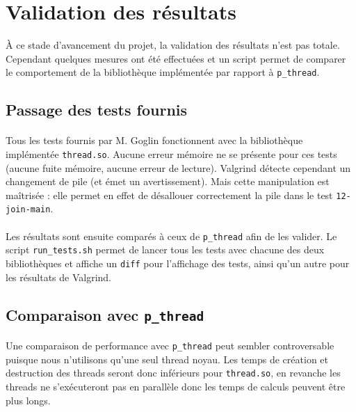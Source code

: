 \section{Validation des résultats}

\`A ce stade d'avancement du projet, la validation des résultats n'est pas totale. Cependant quelques mesures ont été effectuées et un script permet de comparer le comportement de la bibliothèque implémentée par rapport à \texttt{p\_thread}.

\subsection{Passage des tests fournis}

\paragraph{}
Tous les tests fournis par M. Goglin fonctionnent avec la bibliothèque implémentée \texttt{thread.so}. Aucune erreur mémoire ne se présente pour ces tests (aucune fuite mémoire, aucune erreur de lecture). \textsf{Valgrind} détecte cependant un changement de pile (et émet un avertissement). Mais cette manipulation est maîtrisée : elle permet en effet de désallouer correctement la pile dans le test \texttt{12-join-main}.

\paragraph{}
Les résultats sont ensuite comparés à ceux de \texttt{p\_thread} afin de les valider. Le script \texttt{run\_tests.sh} permet de lancer tous les tests avec chacune des deux bibliothèques et affiche un \texttt{diff} pour l'affichage des tests, ainsi qu'un autre pour les résultats de \textsf{Valgrind}.

\subsection{Comparaison avec \texttt{p\_thread}}

\paragraph{}
Une comparaison de performance avec \texttt{p\_thread} peut sembler controversable puisque nous n'utilisons qu'une seul thread noyau. Les temps de création et destruction des threads seront donc inférieurs pour \texttt{thread.so}, en revanche les threads ne s'exécuteront pas en parallèle donc les temps de calculs peuvent être plus longs.

